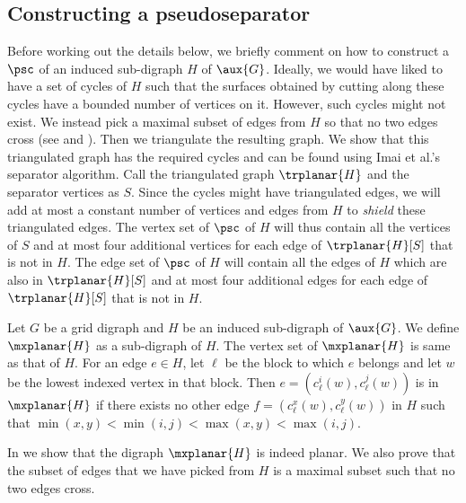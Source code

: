 \documentclass{toc}
\begin{document}
\subsection{Constructing a pseudoseparator}
Before working out the details below, we briefly comment on how to construct a $\psc$ of
%
an induced%
sub-digraph %
 $H$ of $\aux{G}$. Ideally, we would have liked to have a set of cycles of $H$
%
%
%
%
%
%
such that the surfaces obtained by cutting along these cycles have %
a bounded number of vertices 
on it.%
However, such cycles might not exist. We instead pick a maximal subset of edges from $H$ so that no two edges cross (see  and ). Then we triangulate the resulting graph. We show that this triangulated graph has the required cycles and can be found using Imai et al.'s separator algorithm. Call the triangulated graph %
$\trplanar{H}$ and the separator vertices as $S$. Since the cycles might have triangulated edges, we will add at most a constant number of vertices and edges from $H$ to \emph{shield} these triangulated edges. The vertex set of $\psc$ of $H$ will thus contain all the vertices of $S$ and at most four additional vertices for each edge of $\trplanar{H}[S]$ that is not %
 in $H$. The edge set of $\psc$ of $H$ will contain all the edges of $H$ which are also in $\trplanar{H}[S]$ and at most four additional edges for each edge of $\trplanar{H}[S]$ that is not %
 in $H$.

\begin{definition}
\label{def:planar}
Let $G$ be a grid %
digraph %
 and $H$ be
%
an induced  %
sub-digraph %
 of $\aux{G}$. We define $\mxplanar{H}$ as a  %
sub-digraph %
 of $H$. The vertex set of $\mxplanar{H}$ is same as that of $H$. For an edge $e \in H$, let ${\ell}$ be the block to which $e$ belongs and let $w$ be the lowest indexed vertex in that block. Then $e = (c^i_{\ell}(w), c^j_{\ell}(w))$ is in $\mxplanar{H}$ if there exists no other edge $f = (c^x_{\ell}(w), c^y_{\ell}(w))$ in $H$ such that $\min(x,y) < \min(i, j) < \max(x, y) < \max(i, j)$.
\end{definition}

In  we show that the %
digraph %
 $\mxplanar{H}$ is indeed planar. We also prove that the subset of edges that we have picked from $H$ is a maximal subset such that no two edges cross.
\end{document}
